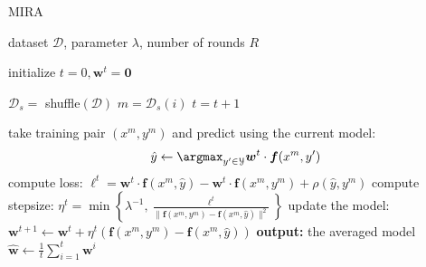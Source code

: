 \begin{algorithm}[t]

   \caption{MIRA \label{alg:mira}}

\begin{algorithmic}[1]
    dataset $\mathcal{D}$, parameter $\lambda$, number of rounds $R$

   \STATE initialize $t = 0, \boldsymbol{w}^t = \mathbf{0}$

         \STATE $\mathcal{D}_s =$ shuffle$(\mathcal{D})$
        \STATE $m = \mathcal{D}_s(i)$
        \STATE $t = t+1$

	\STATE take training pair $(x^m, y^m)$ and predict using the current model: 
	$$\hat{y}  \leftarrow \argmax_{y'\in\mathcal{Y}} \boldsymbol{w}^t \cdot \boldsymbol{f}(x^m,y')$$
	\STATE compute loss: $\ell^t = \boldsymbol{w}^t \cdot \boldsymbol{f}(x^m,\hat{y}) - \boldsymbol{w}^t \cdot \boldsymbol{f}(x^m,y^m) + \rho(\hat{y},y^m)$
	\STATE compute stepsize: $\eta^t = \min\left\{\lambda^{-1}, \frac{\ell^t}{\|\boldsymbol{f}(x^m,y^m) - \boldsymbol{f}(x^m,\hat{y})\|^2}\right\}$
	\STATE update the model: 
	$\boldsymbol{w}^{t+1} \leftarrow  \boldsymbol{w}^{t} + \eta^t  (\boldsymbol{f}(x^m,y^m) - \boldsymbol{f}(x^m,\hat{y}))$
	\ENDFOR
	\ENDFOR
   \STATE \textbf{output:} the averaged model $\hat{\boldsymbol{w}} \leftarrow \frac{1}{t}\sum_{i=1}^{t} \boldsymbol{w}^i$

\end{algorithmic}
%
%
%
%
%

\end{algorithm}



